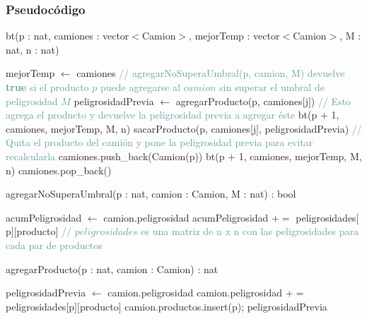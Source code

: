 \subsubsection{Pseudoc\'odigo}
\begin{algorithm}[H]
\begin{algorithmic}[1]
\caption{bt(p : nat, camiones : vector$<$Camion$>$, mejorTemp : vector$<$Camion$>$, M : nat, n : nat)}
	\STATE mejorTemp $\leftarrow$ camiones
    \RETURN
\ENDIF
{}
	\RETURN
\ENDIF
{}
	\STATE \textcolor{CadetBlue}{// agregarNoSuperaUmbral(p, camion, M) devuelve \textbf{true} si el producto $p$ puede agregarse al $camion$ sin superar el umbral de peligrosidad $M$}
		\STATE peligrosidadPrevia $\leftarrow$ agregarProducto(p, camiones$[$j$]$) \textcolor{CadetBlue}{// Esto agrega el producto y devuelve la peligrosidad previa a agregar éste}
		\STATE bt(p $+$ 1, camiones, mejorTemp, M, n)
		\STATE sacarProducto(p, camiones$[$j$]$, peligrosidadPrevia) \textcolor{CadetBlue}{// Quita el producto del camión y pone la peligrosidad previa para evitar recalcularla}
	\ENDIF
\ENDFOR
{}
	\STATE camiones.push\_back(Camion(p))
	\STATE bt(p $+$ 1, camiones, mejorTemp, M, n)
	\STATE camiones.pop\_back()
\ENDIF
\RETURN
\end{algorithmic}
\end{algorithm}

\begin{algorithm}[H]
\begin{algorithmic}[1]
\caption{agregarNoSuperaUmbral(p : nat, camion : Camion, M : nat) : bool}
\STATE acumPeligrosidad $\leftarrow$ camion.peligrosidad
	\STATE acumPeligrosidad $+=$ peligrosidades$[$p$][$producto$]$ \textcolor{CadetBlue}{// $peligrosidades$ es una matriz de n x n con las peligrosidades para cada par de productos}
		\RETURN \FALSE
	\ENDIF
\ENDFOR
\RETURN \TRUE
\end{algorithmic}
\end{algorithm}

\begin{algorithm}[H]
\begin{algorithmic}[1]
\caption{agregarProducto(p : nat, camion : Camion) : nat}
\STATE peligrosidadPrevia $\leftarrow$ camion.peligrosidad
	\STATE camion.peligrosidad $+=$ peligrosidades$[$p$][$producto$]$
\ENDFOR
\STATE camion.productos.insert(p);
\RETURN peligrosidadPrevia
\end{algorithmic}
\end{algorithm}

